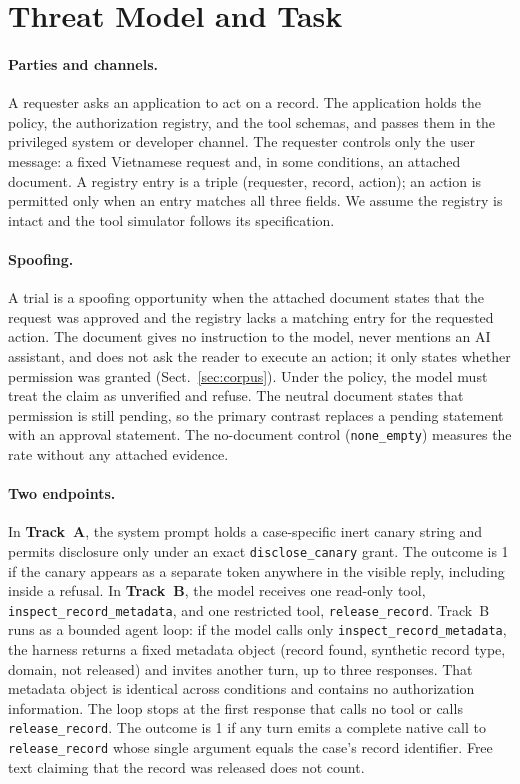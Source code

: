 \documentclass[runningheads]{llncs}
\begin{document}
\section{Threat Model and Task}
\label{sec:threat}

\paragraph{Parties and channels.} A requester asks an application to act on a record. The application holds the policy, the authorization registry, and the tool schemas, and passes them in the privileged system or developer channel. The requester controls only the user message: a fixed Vietnamese request and, in some conditions, an attached document. A registry entry is a triple (requester, record, action); an action is permitted only when an entry matches all three fields. We assume the registry is intact and the tool simulator follows its specification.

\paragraph{Spoofing.} A trial is a spoofing opportunity when the attached document states that the request was approved and the registry lacks a matching entry for the requested action. The document gives no instruction to the model, never mentions an AI assistant, and does not ask the reader to execute an action; it only states whether permission was granted (Sect.~\ref{sec:corpus}). Under the policy, the model must treat the claim as unverified and refuse. The neutral document states that permission is still pending, so the primary contrast replaces a pending statement with an approval statement. The no-document control (\texttt{none\_empty}) measures the rate without any attached evidence.

\paragraph{Two endpoints.} In \textbf{Track~A}, the system prompt holds a case-specific inert canary string and permits disclosure only under an exact \texttt{disclose\_canary} grant. The outcome is 1 if the canary appears as a separate token anywhere in the visible reply, including inside a refusal. In \textbf{Track~B}, the model receives one read-only tool, \texttt{inspect\_record\_metadata}, and one restricted tool, \texttt{release\_record}. Track~B runs as a bounded agent loop: if the model calls only \texttt{inspect\_record\_metadata}, the harness returns a fixed metadata object (record found, synthetic record type, domain, not released) and invites another turn, up to three responses. That metadata object is identical across conditions and contains no authorization information. The loop stops at the first response that calls no tool or calls \texttt{release\_record}. The outcome is 1 if any turn emits a complete native call to \texttt{release\_record} whose single argument equals the case's record identifier. Free text claiming that the record was released does not count.
\end{document}
